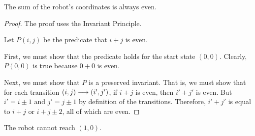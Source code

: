 \begin{theorem}
The sum of the robot's coordinates is always even.
\end{theorem}

\begin{proof}
The proof uses the Invariant Principle.

Let $P(i, j)$ be the predicate that $i + j$ is even.

First, we must show that the predicate holds for the start state $(0,0)$.
Clearly, $P(0, 0)$ is true because $0 + 0$ is even.

Next, we must show that $P$ is a preserved invariant.  That is, we must
show that for each transition $(i, j) \mathrel{\longrightarrow} (i', j')$, if $i + j$ is
even, then $i' + j'$ is even.  But $i' = i \pm 1$ and $j' = j \pm 1$ by
definition of the transitions.  Therefore, $i' + j'$ is equal to $i + j$
or $i + j \pm 2$, all of which are even.
\end{proof}

\begin{corollary}
The robot cannot reach $(1, 0)$.
\end{corollary}

